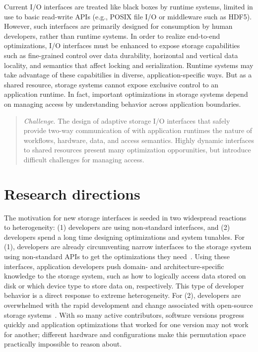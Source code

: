 \documentclass{sig-alternate}
\begin{document}
Current I/O interfaces are treated like black boxes by runtime systems, limited
in use to basic read-write APIs (e.g., POSIX file I/O or middleware such as
HDF5). However, such interfaces are primarily designed for consumption by human
developers, rather than runtime systems.  In order to realize end-to-end
optimizations, I/O interfaces must be enhanced to expose storage capabilities
such as fine-grained control over data durability, horizontal and vertical data
locality, and semantics that affect locking and serialization. Runtime systems
may take advantage of these capabitilies in diverse, application-specific ways.
But as a shared resource, storage systems cannot expose exclusive control to an
application runtime. In fact, important optimizations in storage systems depend
on managing access by understanding behavior across application boundaries.

\begin{quote}
  \emph{Challenge}. The design of adaptive storage I/O interfaces that safely
  provide two-way communication of with application runtimes the nature of
  workflows, hardware, data, and access semantics. Highly dynamic interfaces to shared resources
  present many optimization opporunities, but introduce difficult challenges for
  managing access.
\end{quote}

\section{Research directions}

The motivation for new storage interfaces is seeded in two widespread reactions
to heterogeneity: (1) developers are using non-standard interfaces, and (2)
developers spend a long time designing optimizations and system tunables.  For
(1), developers are already circumventing narrow interfaces to the storage
system using non-standard APIs to get the optimizations they
need~\cite{sevilla:es17-malac}.  Using these interfaces, application developers
push domain- and architecture-specific knowledge to the storage system, such as
how to logically access data stored on disk or which device type to store data
on, respectively.  This type of developer behavior is a direct response to
extreme heterogeneity.  For (2), developers are overwhelmed with the rapid
development and change associated with open-source storage
systems~\cite{watkins:hot17-declstor}. With so many active contributors,
software versions progress quickly and application optimizations that worked
for one version may not work for another; different hardware and configurations
make this permutation space practically impossible to reason about.
\end{document}
